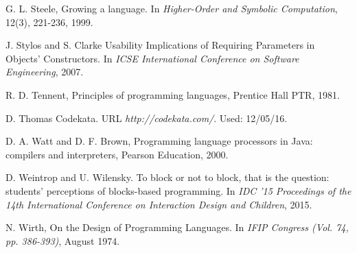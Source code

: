 \documentclass[preprint,10pt]{sigplanconf}
\begin{document}
\begin{thebibliography}{}
G. L. Steele, \newblock Growing a language. \newblock In \emph{Higher-Order and Symbolic Computation}, 12(3), 221-236, 1999.

J. Stylos and S. Clarke \newblock Usability Implications of Requiring Parameters in Objects' Constructors. \newblock In \emph{ICSE International Conference on Software Engineering}, 2007.

R. D. Tennent, \newblock Principles of programming languages, \newblock Prentice Hall PTR, 1981.

D. Thomas \newblock Codekata. \newblock URL \emph{http://codekata.com/}. \newblock Used: 12/05/16.

D. A. Watt and D. F. Brown, \newblock Programming language processors in Java: compilers and interpreters, \newblock Pearson Education, 2000.

D. Weintrop and U. Wilensky. \newblock To block or not to block, that is the question: students' perceptions of blocks-based programming. \newblock In \emph{IDC '15 Proceedings of the 14th International Conference on Interaction Design and Children}, 2015.

N. Wirth, \newblock On the Design of Programming Languages. \newblock In \emph{IFIP Congress (Vol. 74, pp. 386-393)}, August 1974.



\end{thebibliography}
\end{document}
